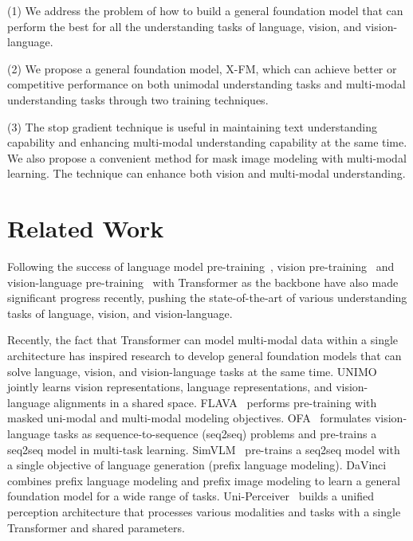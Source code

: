\documentclass[11pt]{article}
\newcommand{\ModelName}{X-FM\xspace}
\begin{document}
(1) We address the problem of how to build a general foundation model that can perform the best for all the understanding tasks of language, vision, and vision-language.

(2) We propose a general foundation model, {\ModelName}, which can achieve better or competitive performance on both unimodal understanding tasks and multi-modal understanding tasks through two training techniques.

(3) The stop gradient technique is useful in maintaining text understanding capability and enhancing multi-modal understanding capability at the same time. We also propose a convenient method for mask image modeling with multi-modal learning. The technique can enhance both vision and multi-modal understanding.

 \vspace{-0.3em}
\vspace{-0.3em}
\section{Related Work}


Following the success of language model pre-training~\citep{devlin2018bert,liu2019roberta,sun2019ernie,joshi2020spanbert,clark2020electra,lan2019albert,zhang2020ambert,he2020deberta}, vision pre-training~\citep{dosovitskiy2020image,he2022masked,bao2021beit,peng2022beit,wei2022masked} 
and vision-language pre-training~\citep{DBLP:conf/icml/RadfordKHRGASAM21,jia2021scaling,li2021align,li2022blip,yuan2021florence,wang2021vlmo,bao2022vl,zeng2021multi,zeng2022x} with Transformer as the backbone have also made significant progress recently, pushing the state-of-the-art of various understanding tasks of language, vision, and vision-language.








Recently, the fact that Transformer can model multi-modal data within a single architecture has inspired research to develop general foundation models that can solve language, vision, and vision-language tasks at the same time. 
UNIMO~\citep{li2020unimo,li2021unimo} jointly learns vision representations, language representations, and vision-language alignments in a shared space.
FLAVA~\citep{singh2021flava} performs pre-training with masked uni-modal and multi-modal modeling objectives. OFA~\citep{wang2022unifying} formulates vision-language tasks as sequence-to-sequence (seq2seq) problems and pre-trains a seq2seq model in multi-task learning. SimVLM~\citep{wang2021simvlm} pre-trains a seq2seq model with a single objective of language generation (prefix language modeling). 
DaVinci~\citep{diao2022prefix} combines prefix language modeling and prefix image modeling to learn a general foundation model for a wide range of tasks. 
Uni-Perceiver~\citep{zhu2021uni,zhu2022uni} builds a unified perception architecture that processes various modalities and tasks with a single Transformer and shared parameters.
\end{document}
